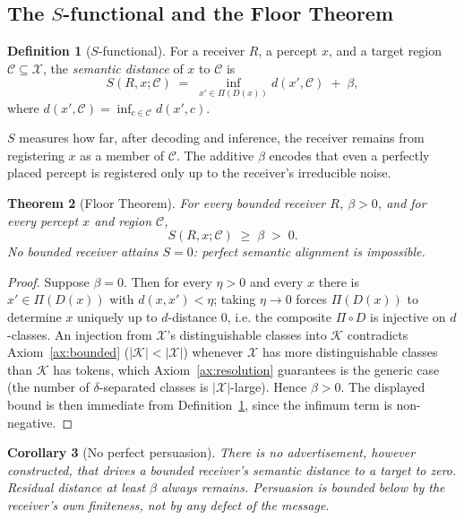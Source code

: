 \documentclass[twocolumn,11pt,a4paper]{article}
\theoremstyle{adv}
\newtheorem{theorem}{Theorem}[section]
\newtheorem{corollary}[theorem]{Corollary}
\theoremstyle{definition}
\newtheorem{definition}[theorem]{Definition}
\theoremstyle{remark}
\newcommand{\Out}{\mathcal{X}}         %
\newcommand{\Know}{\mathcal{K}}        %
\newcommand{\Cell}{\mathcal{C}}        %
\newcommand{\Dec}{D}                   %
\newcommand{\Proj}{\Pi}                %
\newcommand{\Recv}{R}                  %
\newcommand{\Sval}{S}                  %
\newcommand{\floor}{\beta}            %
\newcommand{\dist}{d}
\begin{document}
\subsection{The $S$-functional and the Floor Theorem}

\begin{definition}[$S$-functional]
\label{def:sfunctional}
For a receiver $\Recv$, a percept $x$, and a target region
$\Cell\subseteq\Out$, the \emph{semantic distance} of $x$ to $\Cell$ is
\[
  \Sval(\Recv,x;\Cell)\;=\;\inf_{x'\in\Proj(\Dec(x))}\dist(x',\Cell)\;+\;\floor,
\]
where $\dist(x',\Cell)=\inf_{c\in\Cell}\dist(x',c)$.
\end{definition}

$\Sval$ measures how far, after decoding and inference, the receiver
remains from registering $x$ as a member of $\Cell$. The additive $\floor$
encodes that even a perfectly placed percept is registered only up to the
receiver's irreducible noise.

\begin{theorem}[Floor Theorem]
\label{thm:floor}
For every bounded receiver $\Recv$, $\floor>0$, and for every percept $x$
and region $\Cell$,
\[
  \Sval(\Recv,x;\Cell)\;\ge\;\floor\;>\;0.
\]
No bounded receiver attains $\Sval=0$: perfect semantic alignment is
impossible.
\end{theorem}

\begin{proof}
Suppose $\floor=0$. Then for every $\eta>0$ and every $x$ there is
$x'\in\Proj(\Dec(x))$ with $\dist(x,x')<\eta$; taking $\eta\to0$ forces
$\Proj(\Dec(x))$ to determine $x$ uniquely up to $\dist$-distance $0$, i.e.
the composite $\Proj\circ\Dec$ is injective on $\dist$-classes. An
injection from $\Out$'s distinguishable classes into $\Know$ contradicts
Axiom~\ref{ax:bounded} ($|\Know|<|\Out|$) whenever $\Out$ has more
distinguishable classes than $\Know$ has tokens, which Axiom~\ref{ax:resolution}
guarantees is the generic case (the number of $\delta$-separated classes is
$|\Out|$-large). Hence $\floor>0$. The displayed bound is then immediate
from Definition~\ref{def:sfunctional}, since the infimum term is
non-negative.
\end{proof}

\begin{corollary}[No perfect persuasion]
\label{cor:noperfect}
There is no advertisement, however constructed, that drives a bounded
receiver's semantic distance to a target to zero. Residual distance at
least $\floor$ always remains. Persuasion is bounded below by the
receiver's own finiteness, not by any defect of the message.
\end{corollary}
\end{document}
